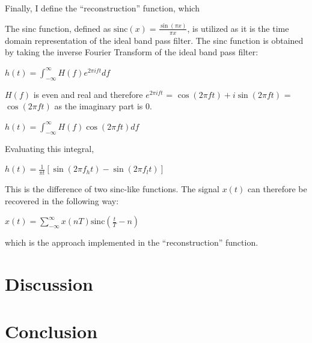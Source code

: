 \documentclass{article}
\begin{document}
Finally, I define the ``reconstruction'' function, which 

The sinc function, defined as $\text{sinc}(x) = \frac{\sin(\pi x)}{\pi x}$, is utilized as it is the time domain representation of the ideal band pass filter.
The sinc function is obtained by taking the inverse Fourier Transform of the ideal band pass filter:
\begin{center}
    \begin{math}
        h(t) = \int_{-\infty}^{\infty} H(f) e^{2\pi i ft} df
    \end{math}  
\end{center}
$H(f)$ is even and real and therefore $e^{2\pi i ft}$ = $\cos(2\pi ft) + i \sin(2\pi ft)$ = $\cos(2\pi ft)$ as the imaginary part is 0.  
\begin{center}
    \begin{math}
        h(t) = \int_{-\infty}^{\infty} H(f) \cos(2\pi ft) df
    \end{math}  
\end{center}
Evaluating this integral,
\begin{center}
    \begin{math}
        h(t) = \frac{1}{\pi t} \left[ \sin(2\pi f_h t) - \sin(2\pi f_l t) \right]
    \end{math}  
\end{center}
This is the difference of two sinc-like functions. 
The signal $x(t)$ can therefore be recovered in the following way:
\begin{center}
    \begin{math}
        x(t) = \sum_{-\infty}^{\infty} x(nT) \text{sinc}\left( \frac{t}{T} - n \right)
    \end{math}  
\end{center}
which is the approach implemented in the ``reconstruction'' function. 

\section{Discussion}

\section{Conclusion}
\end{document}
